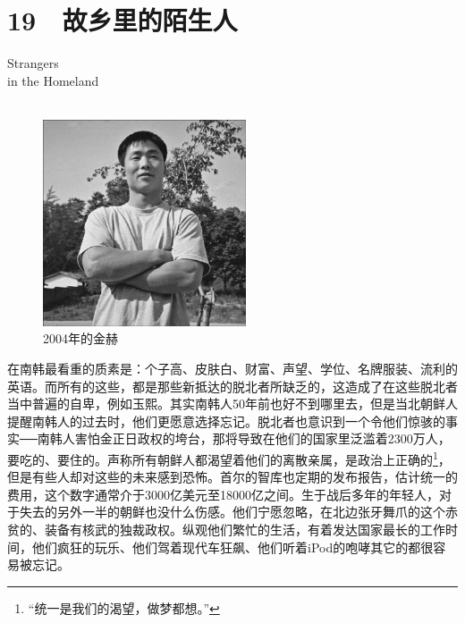 \fancyhead[RO]{{\tiny{\textcolor{Gray}{\FA \ }}}\thepage}
\fancyhead[LE]{{\tiny{\textcolor{Gray}{\FA \ }}}\thepage}
\fancyfoot[LE,RO]{}
\fancyfoot[LO,CE]{}
\fancyfoot[CO,RE]{}
\chapter*{19 {\FA } 故乡里的陌生人}
\begin{flushright}
	\textcolor{PinYinColor}{\EN \huge{Strangers\\
	in the Homeland\\
	\ \\}}
\end{flushright}
\begin{figure}[!htbp]
\centering
\includegraphics[width=6cm]{./Chapters/Images/19.jpg}
\caption*{2004年的金赫}
\end{figure}


在南韩最看重的质素是：个子高、皮肤白、财富、声望、学位、名牌服装、流利的英语。而所有的这些，都是那些新抵达的脱北者所缺乏的，这造成了在这些脱北者当中普遍的自卑，例如玉熙。其实南韩人50年前也好不到哪里去，但是当北朝鲜人提醒南韩人的过去时，他们更愿意选择忘记。脱北者也意识到一个令他们惊骇的事实──南韩人害怕金正日政权的垮台，那将导致在他们的国家里泛滥着2300万人，要吃的、要住的。声称所有朝鲜人都渴望着他们的离散亲属，是政治上正确的\footnote{“统一是我们的渴望，做梦都想。”}，但是有些人却对这些的未来感到恐怖。首尔的智库也定期的发布报告，估计统一的费用，这个数字通常介于3000亿美元至18000亿之间。生于战后多年的年轻人，对于失去的另外一半的朝鲜也没什么伤感。他们宁愿忽略，在北边张牙舞爪的这个赤贫的、装备有核武的独裁政权。纵观他们繁忙的生活，有着发达国家最长的工作时间，他们疯狂的玩乐、他们驾着现代车狂飙、他们听着iPod的咆哮其它的都很容易被忘记。\\

